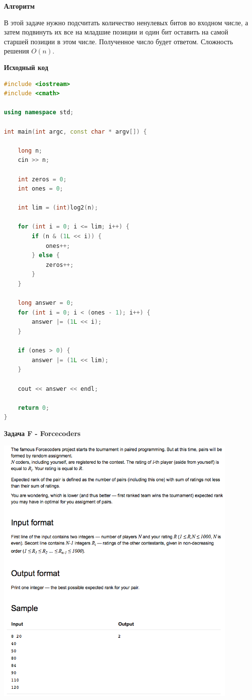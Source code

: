 \documentclass[a4paper,12pt]{article}
\begin{document}
\textbf{{\large Алгоритм}}

В этой задаче нужно подсчитать количество ненулевых битов во входном числе, а затем подвинуть их все на младшие позиции и один бит оставить на самой старшей позиции в этом числе. Полученное число будет ответом. Сложность решения $O(n)$.\\

\newpage

\textbf{{\large Исходный код}} \\
\begin{lstlisting}[language=C++]
#include <iostream>
#include <cmath>

using namespace std;

int main(int argc, const char * argv[]) {
    
    long n;
    cin >> n;
    
    int zeros = 0;
    int ones = 0;
    
    int lim = (int)log2(n);
    
    for (int i = 0; i <= lim; i++) {
        if (n & (1L << i)) {
            ones++;
        } else {
            zeros++;
        }
    }
    
    long answer = 0;
    for (int i = 0; i < (ones - 1); i++) {
        answer |= (1L << i);
    }
    
    if (ones > 0) {
        answer |= (1L << lim);
    }
    
    cout << answer << endl;
    
    return 0;
}
\end{lstlisting}

\newpage
\textbf{{\large Задача F - Forcecoders}}

\begin{center}
\includegraphics[width=0.9\textwidth]{Vekua_2016_Nikita/F.png}\\ [1cm]
\end{center}
\end{document}
